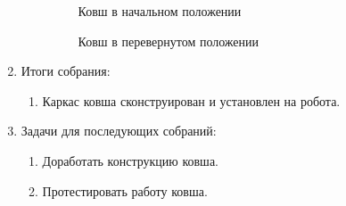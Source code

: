 \begin{enumerate}
\begin{enumerate}
	    \begin{figure}[H]
			\begin{minipage}[h]{0.47\linewidth}
				\caption{Ковш в начальном положении}
			\end{minipage}
			\hfill
			\begin{minipage}[h]{0.47\linewidth}
				\caption{Ковш в перевернутом положении}
			\end{minipage}
		\end{figure}
		
	\end{enumerate}
	
	\item Итоги собрания:
	\begin{enumerate}
		\item Каркас ковша сконструирован и установлен на робота.
		
	\end{enumerate}
	
	\item Задачи для последующих собраний:
	\begin{enumerate}
		\item Доработать конструкцию ковша.
		
		\item Протестировать работу ковша.
		
	\end{enumerate}     
\end{enumerate}

\fillpage

